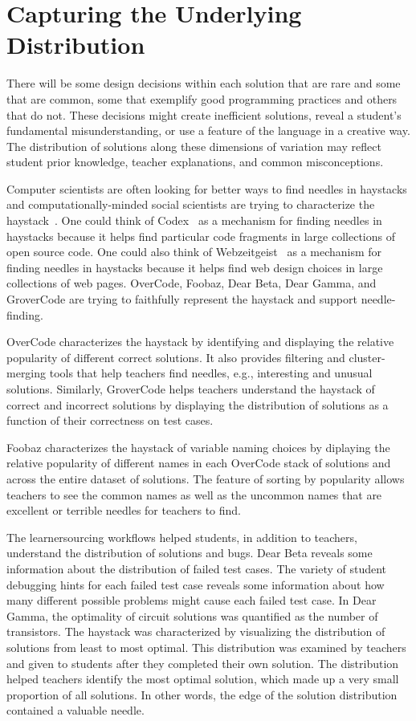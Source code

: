 \section{Capturing the Underlying Distribution}

There will be some design decisions within each solution that are rare and some that are common, some that exemplify good programming practices and others that do not. These decisions might create inefficient solutions, reveal a student's fundamental misunderstanding, or use a feature of the language in a creative way. The distribution of solutions along these dimensions of variation may reflect student prior knowledge, teacher explanations, and common misconceptions. 

Computer scientists are often looking for better ways to find needles in haystacks and computationally-minded social scientists are trying to characterize the haystack~\cite{wallachHaystack}. One could think of Codex~\cite{codex} as a mechanism for finding needles in haystacks because it helps find particular code fragments in large collections of open source code. One could also think of Webzeitgeist~\cite{webzeitgeist} as a mechanism for finding needles in haystacks because it helps find web design choices in large collections of web pages. OverCode, Foobaz, Dear Beta, Dear Gamma, and GroverCode are trying to faithfully represent the haystack and support needle-finding. %

OverCode characterizes the haystack by identifying and displaying the relative popularity of different correct solutions. It also provides filtering and cluster-merging tools that help teachers find needles, e.g., interesting and unusual solutions. Similarly, GroverCode helps teachers understand the haystack of correct and incorrect solutions by displaying the distribution of solutions as a function of their correctness on test cases.

Foobaz characterizes the haystack of variable naming choices by diplaying the relative popularity of different names in each OverCode stack of solutions and across the entire dataset of solutions. The feature of sorting by popularity allows teachers to see the common names as well as the uncommon names that are excellent or terrible needles for teachers to find. 

The learnersourcing workflows helped students, in addition to teachers, understand the distribution of solutions and bugs. Dear Beta reveals some information about the distribution of failed test cases. The variety of student debugging hints for each failed test case reveals some information about how many different possible problems might cause each failed test case. In Dear Gamma, the optimality of circuit solutions was quantified as the number of transistors. The haystack was characterized by visualizing the distribution of solutions from least to most optimal. This distribution was examined by teachers and given to students after they completed their own solution. The distribution helped teachers identify the most optimal solution, which made up a very small proportion of all solutions. In other words, the edge of the solution distribution contained a valuable needle. 

